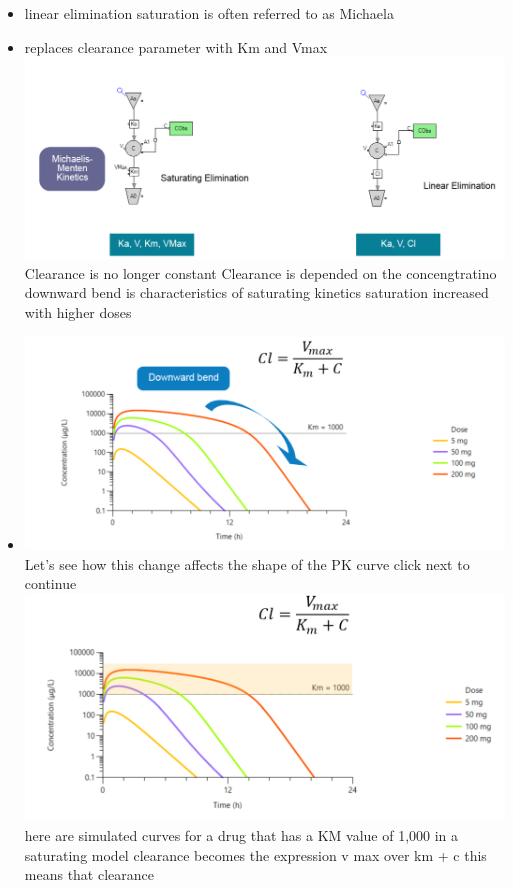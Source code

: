 \documentclass[
  letterpaper,
  DIV=11,
  numbers=noendperiod]{scrreprt}
\begin{document}
\begin{itemize}
\item
  linear elimination saturation is often referred to as Michaela
\item
  replaces clearance parameter with Km and Vmax
  \includegraphics{./img/saturation-1.png} Clearance is no longer
  constant Clearance is depended on the concengtratino downward bend is
  characteristics of saturating kinetics saturation increased with
  higher doses
\item
  \includegraphics{./img/saturation-2.png} Let's see how this change
  affects the shape of the PK curve click next to continue
  \includegraphics{./img/saturation-3.png} here are simulated curves for
  a drug that has a KM value of 1,000 in a saturating model clearance
  becomes the expression v max over km + c this means that clearance

\end{itemize}
\end{document}
